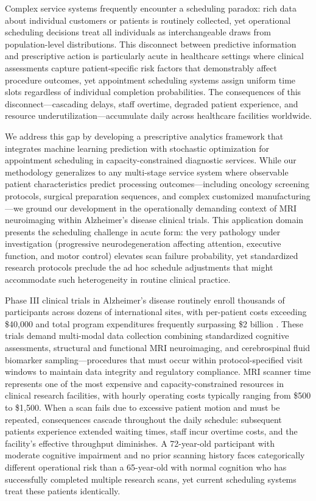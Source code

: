 \documentclass[11pt,a4paper]{article}
\begin{document}
Complex service systems frequently encounter a scheduling paradox: rich data about individual customers or patients is routinely collected, yet operational scheduling decisions treat all individuals as interchangeable draws from population-level distributions. This disconnect between predictive information and prescriptive action is particularly acute in healthcare settings where clinical assessments capture patient-specific risk factors that demonstrably affect procedure outcomes, yet appointment scheduling systems assign uniform time slots regardless of individual completion probabilities. The consequences of this disconnect---cascading delays, staff overtime, degraded patient experience, and resource underutilization---accumulate daily across healthcare facilities worldwide.

We address this gap by developing a prescriptive analytics framework that integrates machine learning prediction with stochastic optimization for appointment scheduling in capacity-constrained diagnostic services. While our methodology generalizes to any multi-stage service system where observable patient characteristics predict processing outcomes---including oncology screening protocols, surgical preparation sequences, and complex customized manufacturing---we ground our development in the operationally demanding context of MRI neuroimaging within Alzheimer's disease clinical trials. This application domain presents the scheduling challenge in acute form: the very pathology under investigation (progressive neurodegeneration affecting attention, executive function, and motor control) elevates scan failure probability, yet standardized research protocols preclude the ad hoc schedule adjustments that might accommodate such heterogeneity in routine clinical practice.

Phase III clinical trials in Alzheimer's disease routinely enroll thousands of participants across dozens of international sites, with per-patient costs exceeding \$40,000 and total program expenditures frequently surpassing \$2 billion \citep{cummings2014clinical}. These trials demand multi-modal data collection combining standardized cognitive assessments, structural and functional MRI neuroimaging, and cerebrospinal fluid biomarker sampling---procedures that must occur within protocol-specified visit windows to maintain data integrity and regulatory compliance. MRI scanner time represents one of the most expensive and capacity-constrained resources in clinical research facilities, with hourly operating costs typically ranging from \$500 to \$1,500. When a scan fails due to excessive patient motion and must be repeated, consequences cascade throughout the daily schedule: subsequent patients experience extended waiting times, staff incur overtime costs, and the facility's effective throughput diminishes. A 72-year-old participant with moderate cognitive impairment and no prior scanning history faces categorically different operational risk than a 65-year-old with normal cognition who has successfully completed multiple research scans, yet current scheduling systems treat these patients identically.
\end{document}
